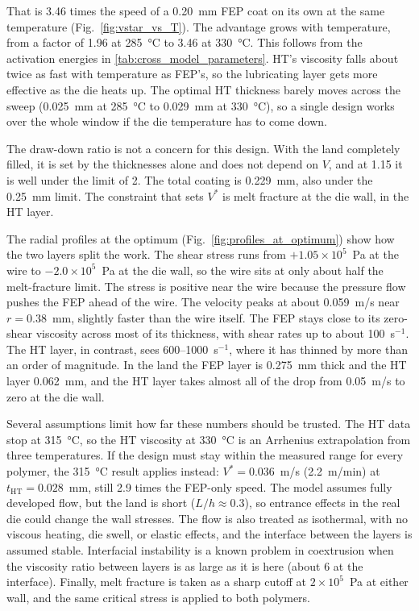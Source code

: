 \documentclass[11pt]{article}
\begin{document}
That is 3.46 times the speed of a 0.20~mm FEP coat on its own at the same temperature (Fig.~\ref{fig:vstar_vs_T}). The advantage grows with temperature, from a factor of 1.96 at 285~°C to 3.46 at 330~°C. This follows from the activation energies in \cref{tab:cross_model_parameters}. HT's viscosity falls about twice as fast with temperature as FEP's, so the lubricating layer gets more effective as the die heats up. The optimal HT thickness barely moves across the sweep (0.025~mm at 285~°C to 0.029~mm at 330~°C), so a single design works over the whole window if the die temperature has to come down.

The draw-down ratio is not a concern for this design. With the land completely filled, it is set by the thicknesses alone and does not depend on $V$, and at 1.15 it is well under the limit of 2. The total coating is 0.229~mm, also under the 0.25~mm limit. The constraint that sets $V^*$ is melt fracture at the die wall, in the HT layer.

The radial profiles at the optimum (Fig.~\ref{fig:profiles_at_optimum}) show how the two layers split the work. The shear stress runs from $+1.05\times10^5$~Pa at the wire to $-2.0\times10^5$~Pa at the die wall, so the wire sits at only about half the melt-fracture limit. The stress is positive near the wire because the pressure flow pushes the FEP ahead of the wire. The velocity peaks at about 0.059~m/s near $r = 0.38$~mm, slightly faster than the wire itself. The FEP stays close to its zero-shear viscosity across most of its thickness, with shear rates up to about 100~s$^{-1}$. The HT layer, in contrast, sees 600--1000~s$^{-1}$, where it has thinned by more than an order of magnitude. In the land the FEP layer is 0.275~mm thick and the HT layer 0.062~mm, and the HT layer takes almost all of the drop from 0.05~m/s to zero at the die wall.

Several assumptions limit how far these numbers should be trusted. The HT data stop at 315~°C, so the HT viscosity at 330~°C is an Arrhenius extrapolation from three temperatures. If the design must stay within the measured range for every polymer, the 315~°C result applies instead: $V^* = 0.036$~m/s (2.2~m/min) at $t_\text{HT} = 0.028$~mm, still 2.9 times the FEP-only speed. The model assumes fully developed flow, but the land is short ($L/h \approx 0.3$), so entrance effects in the real die could change the wall stresses. The flow is also treated as isothermal, with no viscous heating, die swell, or elastic effects, and the interface between the layers is assumed stable. Interfacial instability is a known problem in coextrusion when the viscosity ratio between layers is as large as it is here (about 6 at the interface). Finally, melt fracture is taken as a sharp cutoff at $2\times10^5$~Pa at either wall, and the same critical stress is applied to both polymers.
\end{document}
